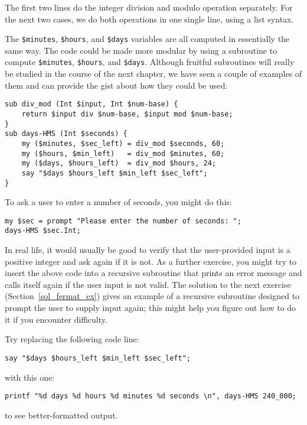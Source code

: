 The first two lines do the integer division and modulo 
operation separately. For the next two cases, we do both 
operations in one single line, using a list syntax.

The \verb'$minutes', \verb'$hours', and \verb'$days' variables 
are all computed in essentially the same way. The code could 
be made more modular by  using a subroutine to compute 
\verb'$minutes', \verb'$hours', and \verb'$days'. Although 
fruitful subroutines will really be studied in the course 
of the next chapter, we have seen a couple of examples of 
them and can provide the gist about how they could be used:

\begin{verbatim}
sub div_mod (Int $input, Int $num-base) {
    return $input div $num-base, $input mod $num-base;
}
sub days-HMS (Int $seconds) {
    my ($minutes, $sec_left) = div_mod $seconds, 60;
    my ($hours, $min_left)   = div_mod $minutes, 60;
    my ($days, $hours_left)  = div_mod $hours, 24;
    say "$days $hours_left $min_left $sec_left"; 
}
\end{verbatim}

To ask a user to enter a number of seconds, you might 
do this:

\begin{verbatim}
my $sec = prompt "Please enter the number of seconds: ";
days-HMS $sec.Int;
\end{verbatim}

In real life, it would usually be good to verify that the 
user-provided input is a positive integer and ask again if it is 
not. As a further exercise, you might try to insert the 
above code into a recursive subroutine that prints an 
error message and calls itself again if the user input is 
not valid. The solution to the next exercise 
(Section~\ref{sol_fermat_ex}) gives an example of a recursive 
subroutine designed to prompt 
the user to supply input again; this might help you figure 
out how to do it if you encounter difficulty. 

Try replacing the following code line:
\begin{verbatim}
say "$days $hours_left $min_left $sec_left"; 
\end{verbatim}
%
with this one:

\begin{verbatim}
printf "%d days %d hours %d minutes %d seconds \n", days-HMS 240_000;
\end{verbatim}
to see better-formatted output.

